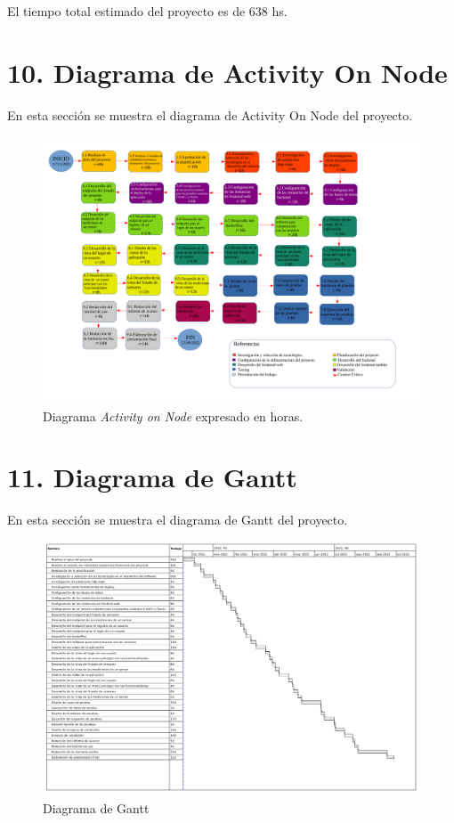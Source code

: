 \documentclass[
11pt, %
]{charter}
\begin{document}
El tiempo total estimado del proyecto es de 638 hs.


\section{10. Diagrama de Activity On Node}
\label{sec:AoN}

En esta sección se muestra el diagrama de Activity On Node del proyecto.

\begin{figure}[htpb]
\centering 
\includegraphics[width=1.0\textwidth]{./Figuras/aon_iot.pdf}
\caption{Diagrama \textit{Activity on Node} expresado en horas.}
\label{fig:AoN}
\end{figure}


\section{11. Diagrama de Gantt}
\label{sec:gantt}

En esta sección se muestra el diagrama de Gantt del proyecto.

\begin{landscape}
\begin{figure}[htpb]
\centering 
\includegraphics[angle=0,height=0.9\textheight]{./Figuras/gantt.png}
\caption{Diagrama de Gantt}
\label{fig:diagGantt}
\end{figure}
\end{landscape}
\end{document}

